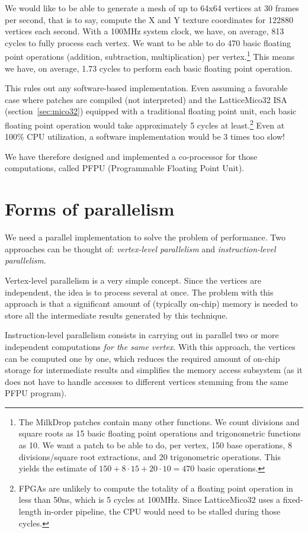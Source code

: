 \documentclass[a4paper,11pt]{kthesis}
\begin{document}
We would like to be able to generate a mesh of up to 64x64 vertices at 30 frames per second, that is to say, compute the X and Y texture coordinates for 122880 vertices each second. With a 100MHz system clock, we have, on average, 813 cycles to fully process each vertex. We want to be able to do 470 basic floating point operations (addition, subtraction, multiplication) per vertex.\footnote{The MilkDrop patches contain many other functions. We count divisions and square roots as 15 basic floating point operations and trigonometric functions as 10. We want a patch to be able to do, per vertex, 150 base operations, 8 divisions/square root extractions, and 20 trigonometric operations. This yields the estimate of $150+8\cdot15+20\cdot10=470$ basic operations.} This means we have, on average, 1.73 cycles to perform each basic floating point operation.

This rules out any software-based implementation. Even assuming a favorable case where patches are compiled (not interpreted) and the LatticeMico32 ISA (section~\ref{sec:mico32}) equipped with a traditional floating point unit, each basic floating point operation would take approximately 5 cycles at least.\footnote{FPGAs are unlikely to compute the totality of a floating point operation in less than 50ns, which is 5 cycles at 100MHz. Since LatticeMico32 uses a fixed-length in-order pipeline, the CPU would need to be stalled during those cycles.} Even at 100\% CPU utilization, a software implementation would be 3 times too slow!

We have therefore designed and implemented a co-processor for those computations, called PFPU (Programmable Floating Point Unit).

\section{Forms of parallelism}
We need a parallel implementation to solve the problem of performance. Two approaches can be thought of: \textit{vertex-level parallelism} and \textit{instruction-level parallelism}.

Vertex-level parallelism is a very simple concept. Since the vertices are independent, the idea is to process several at once. The problem with this approach is that a significant amount of (typically on-chip) memory is needed to store all the intermediate results generated by this technique.

Instruction-level parallelism consists in carrying out in parallel two or more independent computations \textit{for the same vertex}. With this approach, the vertices can be computed one by one, which reduces the required amount of on-chip storage for intermediate results and simplifies the memory access subsystem (as it does not have to handle accesses to different vertices stemming from the same PFPU program).
\end{document}
